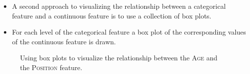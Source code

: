 \documentclass[xcolor={table}]{beamer}
\newcommand{\featN}[1]{\textsc{#1}}
\begin{document}
\begin{frame}
	\begin{itemize}
		\item A second approach to visualizing the relationship between a categorical feature and a continuous feature is to use a collection of box plots. 
		\item For each level of the categorical feature a box plot of the corresponding values of the continuous feature is drawn. 
	\end{itemize}
\end{frame}


 \begin{frame} [plain]
\begin{figure}
\centering
{}
\caption{Using box plots to visualize the relationship between the \featN{Age} and the \featN{Position} feature.}
\label{fig:boxPlotPlotExample}

\end{figure}
\end{frame} 
\end{document}
